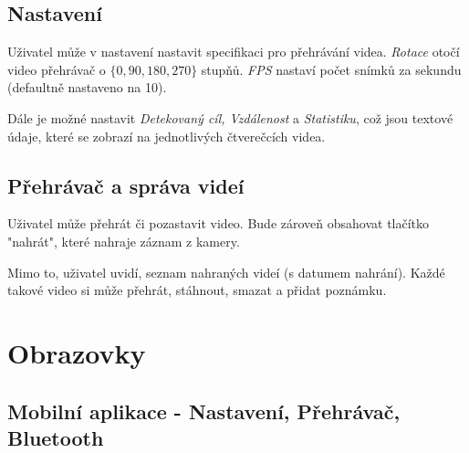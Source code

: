 \documentclass[12pt,a4paper]{article}
\begin{document}
\subsection{Nastavení}
Uživatel může v nastavení nastavit specifikaci pro přehrávání videa.
\textit{Rotace} otočí video přehrávač o $ \{0, 90, 180, 270\}$ stupňů. \textit{FPS} nastaví počet snímků za sekundu (defaultně nastaveno na 10).

Dále je možné nastavit \textit{Detekovaný cíl, Vzdálenost} a \textit{Statistiku}, což jsou textové údaje, které se zobrazí na jednotlivých čtverečcích videa.

\subsection{Přehrávač a správa videí}
Uživatel může přehrát či pozastavit video. Bude zároveň obsahovat tlačítko "nahrát", které nahraje záznam z kamery.

Mimo to, uživatel uvidí, seznam nahraných videí (s datumem nahrání). Každé takové video si může přehrát, stáhnout, smazat a přidat poznámku.

\newpage
\section{Obrazovky}

\subsection{Mobilní aplikace - Nastavení, Přehrávač, Bluetooth}
\end{document}

